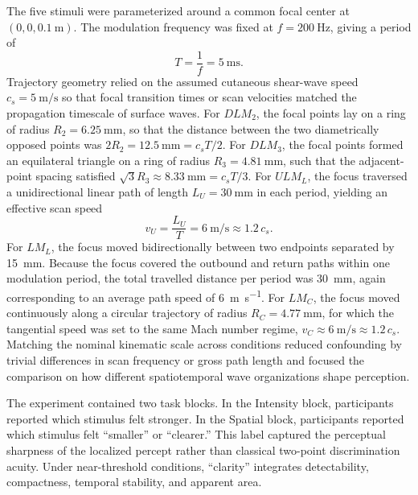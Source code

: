 \documentclass[pdflatex, sn-nature]{sn-jnl}
\theoremstyle{thmstyleone}%
\theoremstyle{thmstyletwo}%
\theoremstyle{thmstylethree}%
\begin{document}
The five stimuli were parameterized around a common focal center at $(0,0,\qty{0.1}{\meter})$. The modulation frequency was fixed at $f=\qty{200}{\hertz}$, giving a period of
\begin{equation}
    T = \frac{1}{f} = \qty{5}{\milli\second} .
\end{equation}
Trajectory geometry relied on the assumed cutaneous shear-wave speed $c_s=\qty{5}{\meter\per\second}$ so that focal transition times or scan velocities matched the propagation timescale of surface waves. For $DLM_2$, the focal points lay on a ring of radius $R_{2}=\qty{6.25}{\milli\meter}$, so that the distance between the two diametrically opposed points was $2R_{2}=\qty{12.5}{\milli\meter}=c_sT/2$. For $DLM_3$, the focal points formed an equilateral triangle on a ring of radius $R_{3}=\qty{4.81}{\milli\meter}$, such that the adjacent-point spacing satisfied $\sqrt{3}R_{3}\approx \qty{8.33}{\milli\meter}=c_sT/3$. For $ULM_L$, the focus traversed a unidirectional linear path of length $L_{U}=\qty{30}{\milli\meter}$ in each period, yielding an effective scan speed
\begin{equation}
    v_U = \frac{L_U}{T} = \qty{6}{\meter\per\second} \approx 1.2\,c_s .
\end{equation}
For $LM_L$, the focus moved bidirectionally between two endpoints separated by \qty{15}{\milli\meter}. Because the focus covered the outbound and return paths within one modulation period, the total travelled distance per period was \qty{30}{\milli\meter}, again corresponding to an average path speed of \qty{6}{\meter\per\second}. For $LM_C$, the focus moved continuously along a circular trajectory of radius $R_C=\qty{4.77}{\milli\meter}$, for which the tangential speed was set to the same Mach number regime, $v_C\approx \qty{6}{\meter\per\second} \approx 1.2\,c_s$. Matching the nominal kinematic scale across conditions reduced confounding by trivial differences in scan frequency or gross path length and focused the comparison on how different spatiotemporal wave organizations shape perception.

The experiment contained two task blocks. In the Intensity block, participants reported which stimulus felt stronger. In the Spatial block, participants reported which stimulus felt ``smaller'' or ``clearer.'' This label captured the perceptual sharpness of the localized percept rather than classical two-point discrimination acuity. Under near-threshold conditions, ``clarity'' integrates detectability, compactness, temporal stability, and apparent area.
\end{document}
